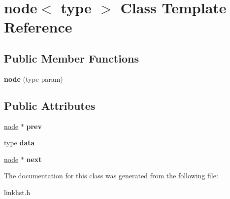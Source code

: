 \hypertarget{classnode}{}\section{node$<$ type $>$ Class Template Reference}
\label{classnode}
\subsection*{Public Member Functions}
\begin{DoxyCompactItemize}
\item 
{\bfseries node} (type param)\hypertarget{classnode_ab6795b27a7f43e021d4495bdd7d1a621}{}\label{classnode_ab6795b27a7f43e021d4495bdd7d1a621}

\end{DoxyCompactItemize}
\subsection*{Public Attributes}
\begin{DoxyCompactItemize}
\item 
\hyperlink{classnode}{node} $\ast$ {\bfseries prev}\hypertarget{classnode_af915b58f2f7e29ef619cdc1c557cf1e4}{}\label{classnode_af915b58f2f7e29ef619cdc1c557cf1e4}

\item 
type {\bfseries data}\hypertarget{classnode_a5afe5cfc27503b97d369fd7d7fea8f5e}{}\label{classnode_a5afe5cfc27503b97d369fd7d7fea8f5e}

\item 
\hyperlink{classnode}{node} $\ast$ {\bfseries next}\hypertarget{classnode_aa2eebb58306baff1e2a52f671ed9ee78}{}\label{classnode_aa2eebb58306baff1e2a52f671ed9ee78}

\end{DoxyCompactItemize}


The documentation for this class was generated from the following file\+:\begin{DoxyCompactItemize}
\item 
linklist.\+h\end{DoxyCompactItemize}
